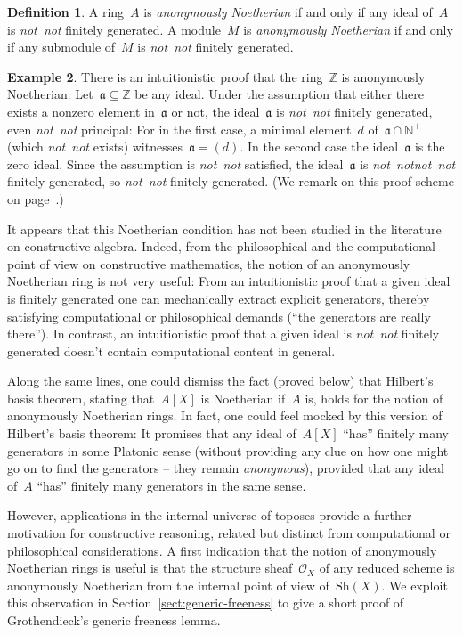 \documentclass[10pt,reqno,a4paper]{amsbook}
\theoremstyle{definition}
\newtheorem{defn}{Definition}[section]
\newtheorem{ex}[defn]{Example}
\theoremstyle{plain}
\theoremstyle{remark}
\newcommand{\ZZ}{\mathbb{Z}}
\renewcommand{\O}{\mathcal{O}}
\newcommand{\NN}{\mathbb{N}}
\newcommand{\aaa}{\mathfrak{a}}
\newcommand{\Sh}{\mathrm{Sh}}
\newcommand{\?}{\,{:}\,}
\renewcommand{\_}{\mathpunct{.}\,}
\newcommand{\notnot}{\emph{not~not}\xspace}
\begin{document}
{\begin{defn}A ring~$A$ is \emph{anonymously Noetherian} if and only if any ideal
of~$A$ is \notnot finitely generated. A module~$M$ is \emph{anonymously Noetherian}
if and only if any submodule of~$M$ is \notnot finitely generated.\end{defn}

\begin{ex}There is an intuitionistic proof that the ring~$\ZZ$ is anonymously
Noetherian: Let~$\aaa \subseteq \ZZ$ be any ideal. Under the assumption that
either there exists a nonzero element in~$\aaa$ or not, the ideal~$\aaa$ is
\notnot finitely generated, even \notnot principal: For in the first case, a
minimal element~$d$ of~$\aaa \cap \NN^+$ (which \notnot exists) witnesses~$\aaa
= (d)$. In the second case the ideal~$\aaa$ is the zero ideal. Since the
assumption is \notnot satisfied, the ideal~$\aaa$ is \notnot \notnot finitely
generated, so \notnot finitely generated. (We remark on this proof scheme on
page~\pageref{proof-scheme-boxed-statements}.) \end{ex}

It appears that this Noetherian condition has not been studied in the
literature on constructive algebra. Indeed, from the philosophical and the
computational point of view on constructive mathematics, the notion of an anonymously
Noetherian ring is not very useful: From an intuitionistic proof that a given
ideal is finitely generated one can mechanically extract explicit generators,
thereby satisfying computational or philosophical demands (``the generators are
really there''). In contrast, an intuitionistic proof that a given ideal is
\notnot finitely generated doesn't contain computational content in general.

Along the same lines, one could dismiss the fact (proved below) that Hilbert's
basis theorem, stating that~$A[X]$ is Noetherian if~$A$ is, holds for the
notion of anonymously Noetherian rings. In fact, one could feel mocked by this
version of Hilbert's basis theorem: It promises that any ideal of~$A[X]$
``has'' finitely many generators in some Platonic sense (without providing any
clue on how one might go on to find the generators -- they remain \emph{anonymous}), provided
that any ideal of~$A$ ``has'' finitely many generators in the same sense.

However, applications in the internal universe of toposes provide a further
motivation for constructive reasoning, related but distinct from computational
or philosophical considerations. A first indication that the notion of anonymously
Noetherian rings is useful is that the structure sheaf~$\O_X$ of any reduced
scheme is anonymously Noetherian from the internal point of view of~$\Sh(X)$. We
exploit this observation in Section~\ref{sect:generic-freeness} to give a short
proof of Grothendieck's generic freeness lemma.

}
\end{document}

